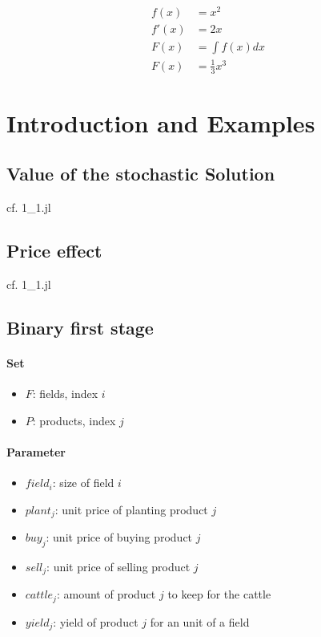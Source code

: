 \documentclass{article}
\begin{document}
\begin{align}
f(x) &= x^2\\
f'(x) &= 2x\\
F(x) &= \int f(x)dx\\
F(x) &= \frac{1}{3}x^3
\end{align}

\section{Introduction and Examples}

\subsection{Value of the stochastic Solution}
cf. 1\_1.jl

\subsection{Price effect}
cf. 1\_1.jl

\subsection{Binary first stage}
\paragraph{Set}
\begin{itemize}
	\item $F$: fields, index $i$
	\item $P$: products, index $j$
\end{itemize}
\paragraph{Parameter}
\begin{itemize}
	\item $field_i$: size of field $i$
	\item $plant_j$: unit price of planting product $j$
	\item $buy_j$: unit price of buying product $j$
	\item $sell_j$: unit price of selling product $j$
	\item $cattle_j$: amount of product $j$ to keep for the cattle
	\item $yield_j$: yield of product $j$ for an unit of a field 
\end{itemize}
\end{document}
